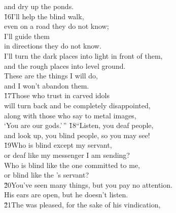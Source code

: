 \begin{poetry}
\poemll    and dry up the ponds. \\
\poeml \v{16}I'll help the blind walk, \\
\poemll    even on a road they do not know; \\
\poeml I'll guide them \\
\poemll    in directions they do not know. \\
\poeml I'll turn the dark places into light in front of them, \\
\poemll    and the rough places into level ground. \\
\poeml These are the things I will do, \\
\poemll    and I won't abandon them. \\
\poeml \v{17}Those who trust in carved idols \\
\poemll    will turn back and be completely disappointed, \\
\poeml along with those who say to metal images, \\
\poemll    `You are our gods.'\,''
\poeml \v{18}``Listen, you deaf people, \\
\poemll    and look up, you blind people, so you may see! \\
\poeml \v{19}Who is blind except my servant, \\
\poemll    or deaf like my messenger I am sending? \\
\poeml Who is blind like the one committed to me, \\
\poemll    or blind like the 's servant? \\
\poeml \v{20}You've seen many things, but you pay no attention. \\
\poemll    His ears are open, but he doesn't listen. \\
\poeml \v{21}The  was pleased, for the sake of his vindication, \\

\end{poetry}
